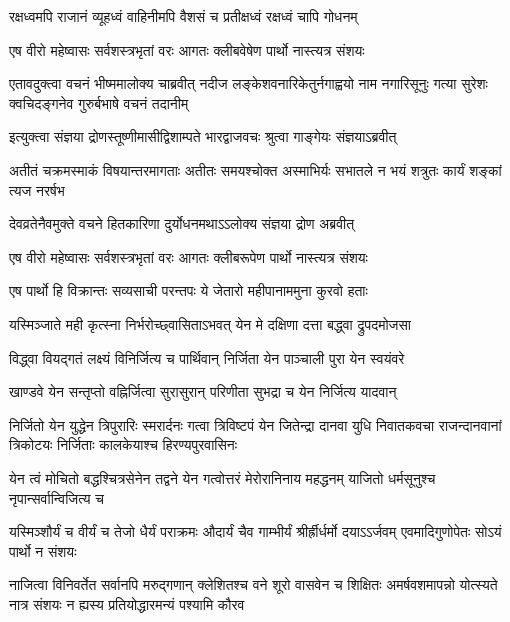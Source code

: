 \twolineshloka
{रक्षध्वमपि राजानं व्यूहध्वं वाहिनीमपि}
{वैशसं च प्रतीक्षध्वं रक्षध्वं चापि गोधनम्}


\twolineshloka
{एष वीरो महेष्वासः सर्वशस्त्रभृतां वरः}
{आगतः क्लीबवेषेण पार्थो नास्त्यत्र संशयः}


\onelineshloka
{एतावदुक्त्वा वचनं भीष्ममालोक्य चाब्रवीत्}
\twolineshloka
{नदीज लङ्केशवनारिकेतुर्नगाह्वयो नाम नगारिसूनुः}
{गत्या सुरेशः क्वचिदङ्गनेव गुरुर्बभाषे वचनं तदानीम्}



\twolineshloka
{इत्युक्त्वा संज्ञया द्रोणस्तूष्णीमासीद्विशाम्पते}
{भारद्वाजवचः श्रुत्वा गाङ्गेयः संज्ञयाऽब्रवीत्}


\threelineshloka
{अतीतं चक्रमस्माकं विषयान्तरमागताः}
{अतीतः समयश्चोक्त अस्माभिर्यः सभातले}
{न भयं शत्रुतः कार्यं शङ्कां त्यज नरर्षभ}


\twolineshloka
{देवव्रतेनैवमुक्ते वचने हितकारिणा}
{दुर्योधनमथाऽऽलोक्य संज्ञया द्रोण अब्रवीत्}


\twolineshloka
{एष वीरो महेष्वासः सर्वशस्त्रभृतां वरः}
{आगतः क्लीबरूपेण पार्थो नास्त्यत्र संशयः}


\twolineshloka
{एष पार्थो हि विक्रान्तः सव्यसाची परन्तपः}
{ये जेतारो महीपानाममुना कुरवो हताः}


\twolineshloka
{यस्मिञ्जाते मही कृत्स्ना निर्भरोच्छ्वासिताऽभवत्}
{येन मे दक्षिणा दत्ता बद्ध्वा द्रुपदमोजसा}


\twolineshloka
{विद्ध्वा वियद्गतं लक्ष्यं विनिर्जित्य च पार्थिवान्}
{निर्जिता येन पाञ्चाली पुरा येन स्वयंवरे}


\twolineshloka
{खाण्डवे येन सन्तृप्तो वह्निर्जित्वा सुरासुरान्}
{परिणीता सुभद्रा च येन निर्जित्य यादवान्}


\onelineshloka
{निर्जितो येन युद्धेन त्रिपुरारिः स्मरार्दनः}
\threelineshloka
{गत्वा त्रिविष्टपं येन जितेन्द्रा दानवा युधि}
{निवातकवचा राजन्दानवानां त्रिकोटयः}
{निर्जिताः कालकेयाश्च हिरण्यपुरवासिनः}


\onelineshloka
{येन त्वं मोचितो बद्धश्चित्रसेनेन तद्वने}
\twolineshloka
{येन गत्वोत्तरं मेरोरानिनाय महद्धनम्}
{याजितो धर्मसूनुश्च नृपान्सर्वान्विजित्य च}


\threelineshloka
{यस्मिञ्शौर्यं च वीर्यं च तेजो धैर्यं पराक्रमः}
{औदार्यं चैव गाम्भीर्यं श्रीर्ह्रीर्धर्मो दयाऽऽर्जवम्}
{एवमादिगुणोपेतः सोऽयं पार्थो न संशयः}


\onelineshloka
{नाजित्वा विनिवर्तेत सर्वानपि मरुद्गणान्}
\threelineshloka
{क्लेशितश्च वने शूरो वासवेन च शिक्षितः}
{अमर्षवशमापन्नो योत्स्यते नात्र संशयः}
{न ह्यस्य प्रतियोद्धारमन्यं पश्यामि कौरव}


